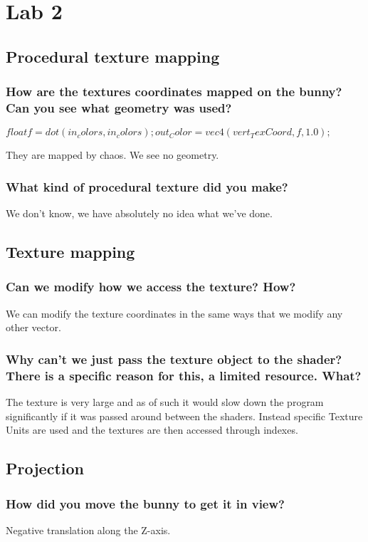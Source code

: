 \documentclass[a4paper,12pt]{article}
\begin{document}
\section{Lab 2}
\subsection{Procedural texture mapping}
\subsubsection{How are the textures coordinates mapped on the bunny? Can you see what geometry was used?}
$
  float f = dot(in_colors, in_colors);
  out_Color = vec4(vert_TexCoord, f, 1.0);
$

They are mapped by chaos. We see no geometry.

\subsubsection{What kind of procedural texture did you make?}
We don't know, we have absolutely no idea what we've done.


\subsection{Texture mapping}
\subsubsection{Can we modify how we access the texture? How?}
We can modify the texture coordinates in the same ways that we modify any other vector.

\subsubsection{Why can't we just pass the texture object to the shader? There is a specific reason for this, a limited resource. What?}
The texture is very large and as of such it would slow down the program significantly if it was passed around between the shaders. Instead specific Texture Units are used and the textures are then accessed through indexes.

\subsection{Projection}
\subsubsection{How did you move the bunny to get it in view?}
Negative translation along the Z-axis.
\end{document}
